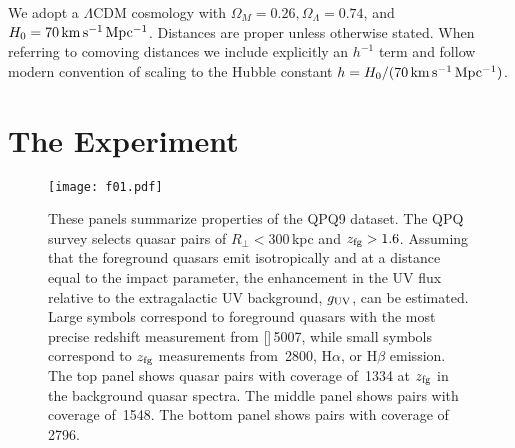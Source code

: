 \documentclass[iop]{emulateapj}
\begin{document}

We adopt a $\Lambda$CDM cosmology with $\Omega_M=0.26, \Omega_\Lambda=0.74$, and
$H_0=70\,{\rm km\,s^{-1}\,Mpc^{-1}}$. Distances are proper unless otherwise stated. When referring
to comoving distances we include explicitly an $h^{-1}$ term and follow modern convention of
scaling to the Hubble constant $h = H_0/(70\,{\rm km\,s^{-1}\,Mpc^{-1}})$.

\section{The Experiment}
\label{sec:experiment}

%


\begin{figure}
\texttt{[image: f01.pdf]}
\caption{These panels summarize properties of the QPQ9 dataset. The QPQ survey selects
quasar pairs of $R_\perp < 300$\,kpc and $z_{\rm fg}>1.6$. Assuming that the foreground quasars
emit isotropically and at a distance equal to the impact parameter, the enhancement in the UV
flux relative to the extragalactic UV background, $g_{\rm UV}$, can be estimated. Large
symbols correspond to foreground quasars with the most precise redshift measurement from
[]\,5007, while small symbols correspond to $z_{\rm fg}$
measurements from \,2800, H$\alpha$, or H$\beta$ emission. The top panel shows
quasar pairs with coverage of \,1334 at $z_{\rm fg}$ in the background quasar spectra.
The middle panel shows pairs with coverage of \,1548. The bottom panel shows
pairs with coverage of \,2796.
}
\label{fig:experiment}
\end{figure}
\end{document}
